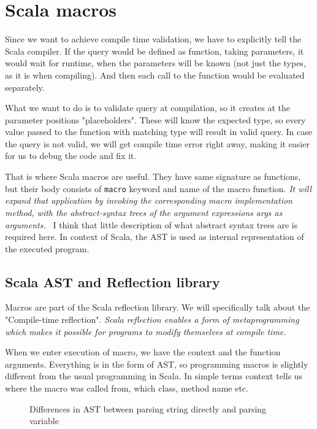 \section{Scala macros}
Since we want to achieve compile time validation, we have to explicitly tell the Scala compiler. If the query would be defined as function, taking parameters, it would wait for runtime, when the parameters will be known (not just the types, as it is when compiling). And then each call to the function would be evaluated separately.

What we want to do is to validate query at compilation, so it creates at the parameter positions "placeholders". These will know the expected type, so every value passed to the function with matching type will result in valid query. In case the query is not valid, we will get compile time error right away, making it easier for us to debug the code and fix it.

That is where Scala macros are useful. They have same signature as functions, but their body consists of \texttt{macro} keyword and name of the macro function.  \textit{It will expand that application by invoking the corresponding macro implementation method, with the abstract-syntax trees of the argument expressions args as arguments.}~\cite{Def macros} I think that little description of what abstract syntax trees are is required here. In context of Scala, the AST is used as internal representation of the executed program. 

\subsection{Scala AST and Reflection library}
Macros are part of the Scala reflection library. We will specifically talk about the "Compile-time reflection". \textit{Scala reflection enables a form of metaprogramming which makes it possible for programs to modify themselves at compile time.}\cite{Compile-time reflection} 

When we enter execution of macro, we have the context and the function arguments. Everything is in the form of AST, so programming macros is slightly different from the usual programming in Scala. In simple terms context tells us where the macro was called from, which class, method name etc. 

\begin{figure}[h]
  \caption {Differences in AST between parsing string directly and parsing variable}
\end{figure}

